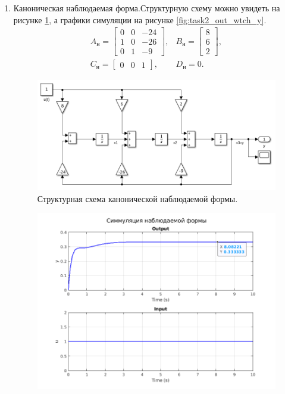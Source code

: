 \begin{enumerate}
    \item Каноническая наблюдаемая форма.Структурную схему можно увидеть
    на рисунке \ref{fig:task2_slx_wtch}, а графики симуляции на рисунке 
    \ref{fig:task2_out_wtch_y}.
    \begin{equation*}
        \begin{array}{cc}
            A_\text{н}=\begin{bmatrix}
                0 & 0 & -24 \\
                1 & 0 & -26 \\
                0 & 1 & -9
            \end{bmatrix}, &
            B_\text{н}=\begin{bmatrix}
                8 \\ 6 \\ 2
            \end{bmatrix}, \\[7mm]
            C_\text{н}=\begin{bmatrix}
                0 & 0 & 1
            \end{bmatrix}, &
            D_\text{н}=0.
        \end{array}
    \end{equation*}
    \begin{figure}[htbp]
        \centering
        \includegraphics[width=0.9\linewidth]{figs/task_2_slx_wtch.png}
        \caption{Структурная схема канонической наблюдаемой формы.}
        \label{fig:task2_slx_wtch}
    \end{figure}
    \begin{figure}[htbp]
        \centering
        \includegraphics[width=\linewidth]{figs/task_2_out_wtch_y.png}

\end{figure}
\end{enumerate}
